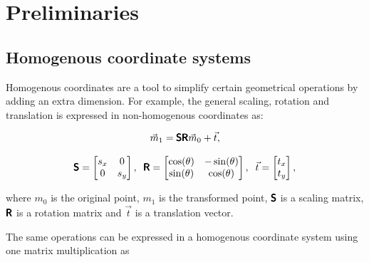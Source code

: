 \chapter{Preliminaries}

\label{chapter:preliminaries}
\section{Homogenous coordinate systems}

Homogenous coordinates are a tool to simplify certain geometrical operations by adding an extra dimension.
For example, the general scaling, rotation and translation is expressed in non-homogenous coordinates as:

\begin{equation}
    \vec{m}_1 = 
    \pmb{\mathsf{S}} \pmb{\mathsf{R}}
    \vec{m}_0
    + \vec{t},
\end{equation}

\begin{equation}
    \pmb{\mathsf{S}} = \begin{bmatrix} s_x & 0 \\ 0 & s_y \end{bmatrix}, \;\; 
    \pmb{\mathsf{R}} = \begin{bmatrix} \cos(\theta) & -\sin(\theta) \\ \sin(\theta) & \cos(\theta) \end{bmatrix}, \;\;
    \vec{t} = \begin{bmatrix} t_x \\ t_y \end{bmatrix},
\end{equation}

where $m_0$ is the original point,
$m_1$ is the transformed point, 
$\pmb{\mathsf{S}}$ is a scaling matrix,
$\pmb{\mathsf{R}}$ is a rotation matrix and 
$\vec{t}$ is a translation vector.

The same operations can be expressed in a homogenous coordinate system using one matrix multiplication as

